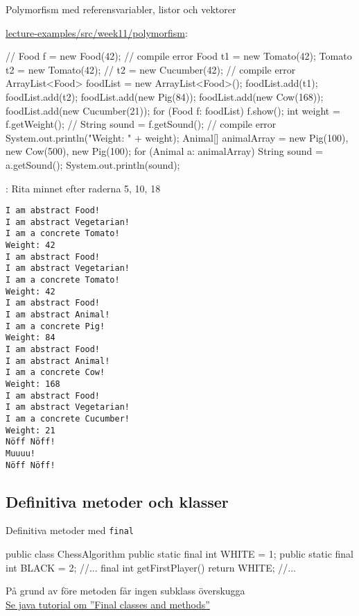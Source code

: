 \documentclass{lecturenotes}
\begin{document}
\begin{Slide}{Polymorfism med referensvariabler, listor och vektorer}
  \begin{minipage}{0.6\linewidth}   
\footnotesize\href{https://github.com/bjornregnell/lth-eda016-2015/tree/master/lectures/examples/eclipse-ws/lecture-examples/src/week11/polymorfism}{lecture-examples/src/week11/polymorfism}:


\begin{Code}[basicstyle=\ttfamily\fontsize{6}{7}\selectfont, numberstyle=,numbers=left]
// Food f = new Food(42);   // compile error
Food t1 = new Tomato(42);
Tomato t2 = new Tomato(42); 
// t2 = new Cucumber(42);   // compile error
ArrayList<Food> foodList = new ArrayList<Food>();
foodList.add(t1);
foodList.add(t2);
foodList.add(new Pig(84));
foodList.add(new Cow(168));
foodList.add(new Cucumber(21));
for (Food f: foodList){
    f.show();
    int weight = f.getWeight();
    // String sound = f.getSound(); // compile error
    System.out.println("Weight: " + weight);
}
Animal[] animalArray = 
    {new Pig(100), new Cow(500), new Pig(100)};
for (Animal a: animalArray){
    String sound = a.getSound();
    System.out.println(sound);
}
\end{Code}
: Rita minnet efter raderna 5, 10, 18
\end{minipage}
\hspace{0.5cm}
\begin{minipage}[]{0.2\linewidth}  \fontsize{7}{8}\selectfont
\begin{verbatim}
I am abstract Food!
I am abstract Vegetarian!
I am a concrete Tomato!
Weight: 42
I am abstract Food!
I am abstract Vegetarian!
I am a concrete Tomato!
Weight: 42
I am abstract Food!
I am abstract Animal!
I am a concrete Pig!
Weight: 84
I am abstract Food!
I am abstract Animal!
I am a concrete Cow!
Weight: 168
I am abstract Food!
I am abstract Vegetarian!
I am a concrete Cucumber!
Weight: 21
Nöff Nöff!
Muuuu!
Nöff Nöff!
\end{verbatim}
  \end{minipage}
\end{Slide}

\subsection{Definitiva metoder och klasser}
\begin{Slide}{Definitiva metoder med \texttt{final}}
\begin{Code}
public class ChessAlgorithm {
    public static final int WHITE = 1;
    public static final int BLACK = 2;
    //...
    final int getFirstPlayer() {
        return WHITE;
    }
    //...
}
\end{Code}
På grund av  före metoden får ingen subklass överskugga \\
\href{https://docs.oracle.com/javase/tutorial/java/IandI/final.html}{Se java tutorial om ''Final classes and methods''}
\end{Slide}
\end{document}
